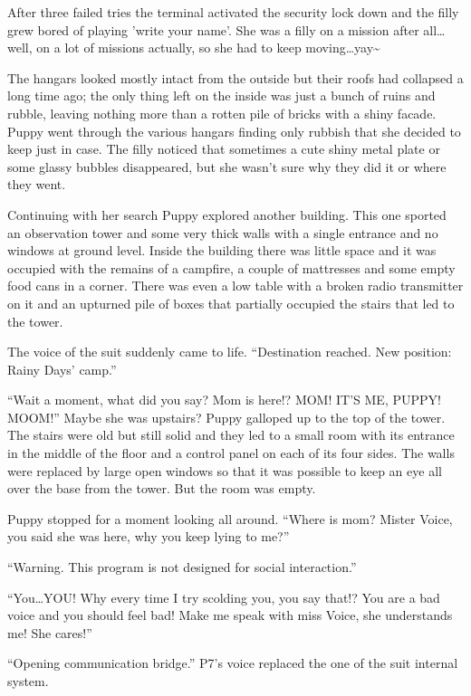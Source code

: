 After three failed tries the terminal activated the security lock down and the filly grew bored of playing 'write your name'. She was a filly on a mission after all\dots well, on a lot of missions actually, so she had to keep moving\dots yay\textasciitilde{}

The hangars looked mostly intact from the outside but their roofs had collapsed a long time ago; the only thing left on the inside was just a bunch of ruins and rubble, leaving nothing more than a rotten pile of bricks with a shiny facade. Puppy went through the various hangars finding only rubbish that she decided to keep just in case. The filly noticed that sometimes a cute shiny metal plate or some glassy bubbles disappeared, but she wasn't sure why they did it or where they went.

Continuing with her search Puppy explored another building. This one sported an observation tower and some very thick walls with a single entrance and no windows at ground level. Inside the building there was little space and it was occupied with the remains of a campfire, a couple of mattresses and some empty food cans in a corner. There was even a low table with a broken radio transmitter on it and an upturned pile of boxes that partially occupied the stairs that led to the tower.

The voice of the suit suddenly came to life. ``Destination reached. New position: Rainy Days' camp.''

``Wait a moment, what did you say? Mom is here!? MOM! IT'S ME, PUPPY! MOOM!'' Maybe she was upstairs? Puppy galloped up to the top of the tower. The stairs were old but still solid and they led to a small room with its entrance in the middle of the floor and a control panel on each of its four sides. The walls were replaced by large open windows so that it was possible to keep an eye all over the base from the tower. But the room was empty.

Puppy stopped for a moment looking all around. ``Where is mom? Mister Voice, you said she was here, why you keep lying to me?''

``{\mt Warning. This program is not designed for social interaction.}''

``You\dots YOU! Why every time I try scolding you, you say that!? You are a bad voice and you should feel bad! Make me speak with miss Voice, she understands me! She cares!''

``{\mt Opening communication bridge.}'' P7's voice replaced the one of the suit internal system.

